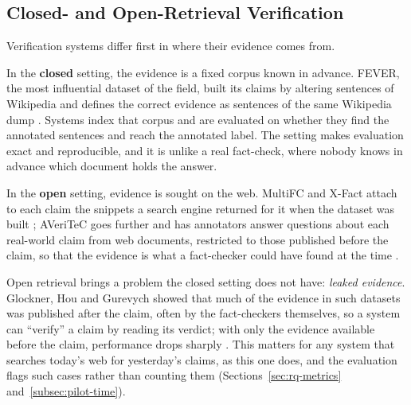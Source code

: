 
\subsection{Closed- and Open-Retrieval Verification}

Verification systems differ first in where their evidence comes from.

In the \textbf{closed} setting, the evidence is a fixed corpus known in
advance. FEVER, the most influential dataset of the field, built its
claims by altering sentences of Wikipedia and defines the correct
evidence as sentences of the same Wikipedia dump
\cite{thorne2018fever}. Systems index that corpus and are evaluated on
whether they find the annotated sentences and reach the annotated
label. The setting makes evaluation exact and reproducible, and it is
unlike a real fact-check, where nobody knows in advance which document
holds the answer.

In the \textbf{open} setting, evidence is sought on the web. MultiFC
and X-Fact attach to each claim the snippets a search engine returned
for it when the dataset was built
\cite{augenstein2019multifc,gupta2021xfact}; AVeriTeC goes further and
has annotators answer questions about each real-world claim from web
documents, restricted to those published before the claim, so that the
evidence is what a fact-checker could have found at the time
\cite{schlichtkrull2023averitec}.

Open retrieval brings a problem the closed setting does not have:
\emph{leaked evidence}. Glockner, Hou and Gurevych showed that much of
the evidence in such datasets was published after the claim, often by
the fact-checkers themselves, so a system can ``verify'' a claim by
reading its verdict; with only the evidence available before the claim,
performance drops sharply \cite{glockner2022missing}. This matters for
any system that searches today's web for yesterday's claims, as this
one does, and the evaluation flags such cases rather than counting them
(Sections~\ref{sec:rq-metrics} and~\ref{subsec:pilot-time}).

